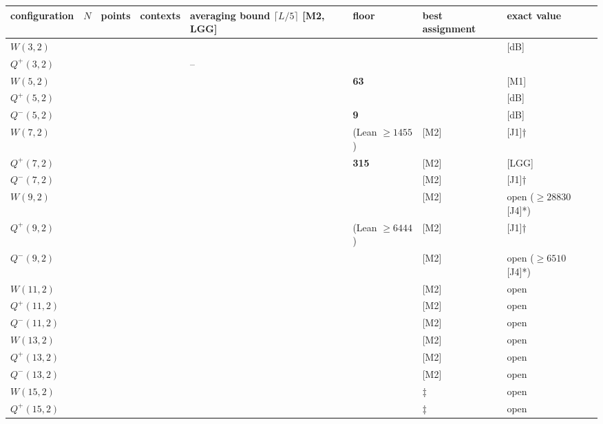 \documentclass[11pt,a4paper]{article}
\begin{document}
{\def\LTcaptype{none} %
{\footnotesize
\begin{longtable}[]{@{}>{\raggedright\arraybackslash}p{}>{\raggedright\arraybackslash}p{}>{\raggedright\arraybackslash}p{}>{\raggedright\arraybackslash}p{}>{\raggedright\arraybackslash}p{}>{\raggedright\arraybackslash}p{}>{\raggedright\arraybackslash}p{}>{\raggedright\arraybackslash}p{}@{}}
\toprule\noalign{}
configuration & \(N\) & points & contexts & averaging bound \(\lceil L/5\rceil\) {[}M2, LGG{]} & floor & best assignment & exact value \\
\midrule\noalign{}
\endhead
\bottomrule\noalign{}
\endlastfoot
\(W(3,2)\) & 2 & 15 & 15 & 3 & 2 & 3 & 3 {[}dB{]} \\
\(Q^+(3,2)\) & 2 & 9 & 6 & -- & 1 & 1 & 1 \\
\(W(5,2)\) & 3 & 63 & 315 & 63 & \textbf{63} & 63 & 63 {[}M1{]} \\
\(Q^+(5,2)\) & 3 & 35 & 105 & 21 & 14 & 21 & 21 {[}dB{]} \\
\(Q^-(5,2)\) & 3 & 27 & 45 & 9 & \textbf{9} & 9 & 9 {[}dB{]} \\
\(W(7,2)\) & 4 & 255 & 5355 & 1071 & 1451 (Lean \(\ge 1455\)) & 1575 {[}M2{]} & 1575 {[}J1{]}† \\
\(Q^+(7,2)\) & 4 & 135 & 1575 & 315 & \textbf{315} & 315 {[}M2{]} & 315 {[}LGG{]} \\
\(Q^-(7,2)\) & 4 & 119 & 1071 & 215 & 291 & 315 {[}M2{]} & 315 {[}J1{]}† \\
\(W(9,2)\) & 5 & 1023 & 86955 & 17391 & 28786 & 31479 {[}M2{]} & open (\(\ge 28830\) {[}J4{]}*) \\
\(Q^+(9,2)\) & 5 & 527 & 23715 & 4743 & 6426 (Lean \(\ge 6444\)) & 6975 {[}M2{]} & 6975 {[}J1{]}† \\
\(Q^-(9,2)\) & 5 & 495 & 19635 & 3927 & 6501 & 7087 {[}M2{]} & open (\(\ge 6510\) {[}J4{]}*) \\
\(W(11,2)\) & 6 & 4095 & 1396395 & 279279 & 527621 & 553140 {[}M2{]} & open \\
\(Q^+(11,2)\) & 6 & 2079 & 365211 & 73043 & 120901 & 132391 {[}M2{]} & open \\
\(Q^-(11,2)\) & 6 & 2015 & 332475 & 66495 & 125624 & 131700 {[}M2{]} & open \\
\(W(13,2)\) & 7 & 16383 & 22362795 & 4472559 & 9227609 & 9406024 {[}M2{]} & open \\
\(Q^+(13,2)\) & 7 & 8255 & 5720715 & 1144143 & 2161542 & 2331191 {[}M2{]} & open \\
\(Q^-(13,2)\) & 7 & 8127 & 5458635 & 1091727 & 2252409 & 2294580 {[}M2{]} & open \\
\(W(15,2)\) & 8 & 65535 & 357886635 & 71577327 & 156705492 & 161360335‡ & open \\
\(Q^+(15,2)\) & 8 & 32895 & 90516075 & 18103215 & 37349846 & 38088999‡ & open \\
\end{longtable}
}
}
\end{document}

